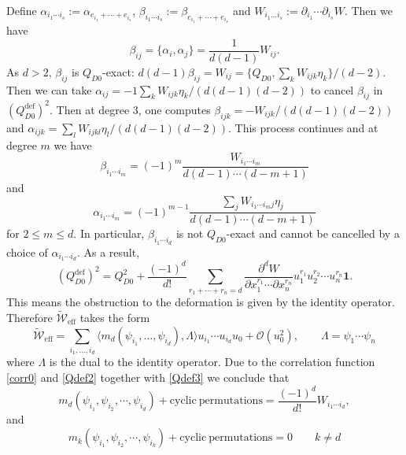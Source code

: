 \documentclass[a4paper,11pt]{article}
\numberwithin{equation}{section}
\begin{document}
Define $\alpha_{i_1\cdots i_s} := \alpha_{e_{i_1} + \cdots + 
e_{i_s}}$, $\beta_{i_1\cdots i_s} :=\beta_{e_{i_1} + \cdots 
+ e_{i_s}}$ and $W_{i_{1}\ldots 
i_{s}}:=\partial_{i_{1}}\cdots\partial_{i_{s}}W$. Then we have
\[
\beta_{ij} = \{ \alpha_i, \alpha_j \} = 
\frac{1}{d(d-1)}W_{ij}.
\]
As $d>2$, $\beta_{ij}$ is $Q_{D0}$-exact: $d (d-1) \beta_{ij} = W_{ij} = \{ 
Q_{D0}, \sum_k W_{ijk} \eta_k \} /(d-2)$. Then we can take $\alpha_{ij} = 
-1\sum_k W_{ijk} \eta_k /(d(d-1)(d-2)) $ to cancel $\beta_{ij}$ in 
$(Q_{D0}^{\mathrm{def}})^{2}$. Then at degree 3, one computes $\beta_{ijk} = - 
W_{ijk}/(d(d-1)(d-2))$ and $\alpha_{ijk} = \sum_l W_{ijkl} 
\eta_l/(d(d-1)(d-2))$. This process continues and at degree $m$ we have
\begin{equation}
\beta_{i_1\cdots i_m} = (-1)^m \frac{W_{i_1\cdots i_m}}{d(d-1)\cdots (d-m+1)}
\end{equation}
and
\begin{equation}
\alpha_{i_1\cdots i_m} = (-1)^{m-1} \frac{\sum_j W_{i_1\cdots i_m j} \eta_j}{d(d-1)\cdots (d-m+1)}
\end{equation}
for $2\leq m \leq d$. In particular, $\beta_{i_1\cdots i_d}$ is not 
$Q_{D0}$-exact and cannot be cancelled by a choice of $\alpha_{i_1\cdots i_d}$. 
As a result,
\begin{equation}\label{Qdef2}
(Q_{D0}^{\mathrm{def}})^{2} = Q_{D0}^2 + \frac{(-1)^d}{d!} \sum_{r_1 + \cdots + 
r_n = d} \frac{\partial^d W}{\partial x_1^{r_1} \cdots \partial x_n^{r_n}} 
u_1^{r_1} u_2^{r_2} \cdots u_n^{r_n}\mathbf{1}.
\end{equation}
This means the obstruction to the deformation is given by the identity operator. 
Therefore $\widetilde{\mathcal{W}}_{\mathrm{eff}}$ takes the form
\begin{equation}\label{Qdef3}
\widetilde{\mathcal{W}}_{\mathrm{eff}}=\sum_{i_{1},\ldots,i_{d}}\langle 
m_{d}(\psi_{i_{1}},\ldots,\psi_{i_{d}}),\Lambda\rangle 
u_{i_{1}}\cdots u_{i_{d}}u_{0}+\mathcal{O}(u_{0}^{2}),\qquad 
\Lambda=\psi_{1}\cdots\psi_{n} 
\end{equation}
where $\Lambda$ is the dual to the identity operator. Due to the 
correlation function \eqref{corr0} and \eqref{Qdef2} together with 
\eqref{Qdef3} we conclude that
\begin{equation}
m_d (\psi_{i_1},\psi_{i_2},\cdots,\psi_{i_d}) + \mathrm{cyclic~permutations} = 
\frac{(-1)^d}{d!} W_{i_1\cdots i_d},
\end{equation}
and
\begin{equation}
m_k (\psi_{i_1},\psi_{i_2},\cdots,\psi_{i_k}) + \mathrm{cyclic~permutations} = 
0\qquad k\neq d
\end{equation}
\end{document}
